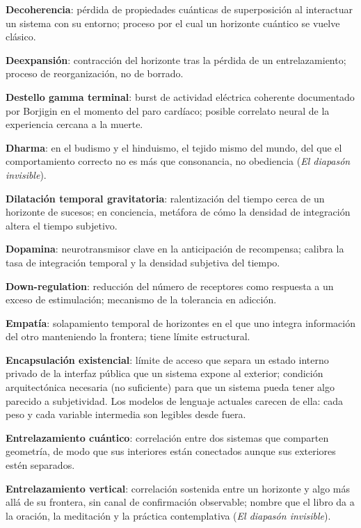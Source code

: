 \glos \textbf{Decoherencia}: pérdida de propiedades cuánticas de superposición al interactuar un sistema con su entorno; proceso por el cual un horizonte cuántico se vuelve clásico.

\glos \textbf{Deexpansión}: contracción del horizonte tras la pérdida de un entrelazamiento; proceso de reorganización, no de borrado.

\glos \textbf{Destello gamma terminal}: burst de actividad eléctrica coherente documentado por Borjigin en el momento del paro cardíaco; posible correlato neural de la experiencia cercana a la muerte.

\glos \textbf{Dharma}: en el budismo y el hinduismo, el tejido mismo del mundo, del que el comportamiento correcto no es más que consonancia, no obediencia (\emph{El diapasón invisible}).

\glos \textbf{Dilatación temporal gravitatoria}: ralentización del tiempo cerca de un horizonte de sucesos; en conciencia, metáfora de cómo la densidad de integración altera el tiempo subjetivo.

\glos \textbf{Dopamina}: neurotransmisor clave en la anticipación de recompensa; calibra la tasa de integración temporal y la densidad subjetiva del tiempo.

\glos \textbf{Down-regulation}: reducción del número de receptores como respuesta a un exceso de estimulación; mecanismo de la tolerancia en adicción.

\glos \textbf{Empatía}: solapamiento temporal de horizontes en el que uno integra información del otro manteniendo la frontera; tiene límite estructural.

\glos \textbf{Encapsulación existencial}: límite de acceso que separa un estado interno privado de la interfaz pública que un sistema expone al exterior; condición arquitectónica necesaria (no suficiente) para que un sistema pueda tener algo parecido a subjetividad. Los modelos de lenguaje actuales carecen de ella: cada peso y cada variable intermedia son legibles desde fuera.

\glos \textbf{Entrelazamiento cuántico}: correlación entre dos sistemas que comparten geometría, de modo que sus interiores están conectados aunque sus exteriores estén separados.

\glos \textbf{Entrelazamiento vertical}: correlación sostenida entre un horizonte y algo más allá de su frontera, sin canal de confirmación observable; nombre que el libro da a la oración, la meditación y la práctica contemplativa (\emph{El diapasón invisible}).

